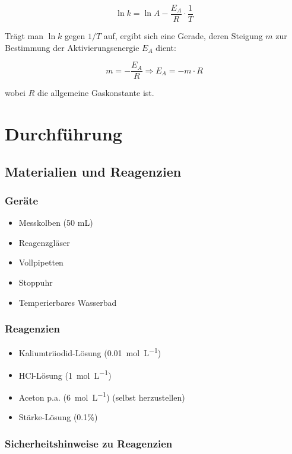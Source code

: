 \begin{equation}
    \ln k = \ln A - \frac{E_A}{R} \cdot \frac{1}{T} \label{eqn:arrhenius-linear}
\end{equation}

Trägt man $\ln k$ gegen $1/T$ auf, ergibt sich eine Gerade, deren Steigung $m$ zur Bestimmung der Aktivierungsenergie $E_A$ dient:

\begin{equation}
m = -\frac{E_A}{R} \Rightarrow E_A = -m \cdot R
\end{equation}

wobei $R$ die allgemeine Gaskonstante ist.

\section{Durchführung}
\subsection{Materialien und Reagenzien}
\subsubsection{Geräte}
\begin{itemize}
    \item Messkolben (50 mL)
    \item Reagenzgläser
    \item Vollpipetten
    \item Stoppuhr
    \item Temperierbares Wasserbad
\end{itemize}
\subsubsection{Reagenzien}
\begin{itemize}
    \item Kaliumtriiodid-Lösung (\qty{0.01}{\mol\per\liter})
    \item HCl-Lösung (\qty{1}{\mol\per\liter})
    \item Aceton p.a. (\qty{6}{\mol\per\liter}) (selbst herzustellen)
    \item Stärke-Lösung (0.1\%)
\end{itemize}

\subsubsection{Sicherheitshinweise zu Reagenzien}
\hfill
{} \\

